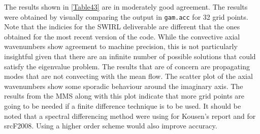 \documentclass[a4paper]{article}
\begin{document}
The results shown in \ref{Table43} are in moderately good agreement. The 
results were obtained by visually comparing the output in \verb|gam.acc| for 32 
grid points. Note that the indicies for the SWIRL deliverable are different that 
the ones obtained for the most recent version of the code. While the 
convective axial wavenumbers show agreement to machine precision, this is not 
particularly insightful given that there are an infinite number of possible solutions 
that could satisfy the eigenvalue problem. The results that are of concern 
are propagating modes that are not convecting with the mean flow.  The scatter plot
of the axial wavenumbers show some sporadic behaviour around the imaginary axis.
The results from the MMS along with this plot indicate that more grid points are going 
to be needed if a finite difference technique is to be used. It should be 
noted that a spectral differencing method were using for Kousen's report and for
srcF2008. Using a higher order scheme would also improve accuracy.
\end{document}
